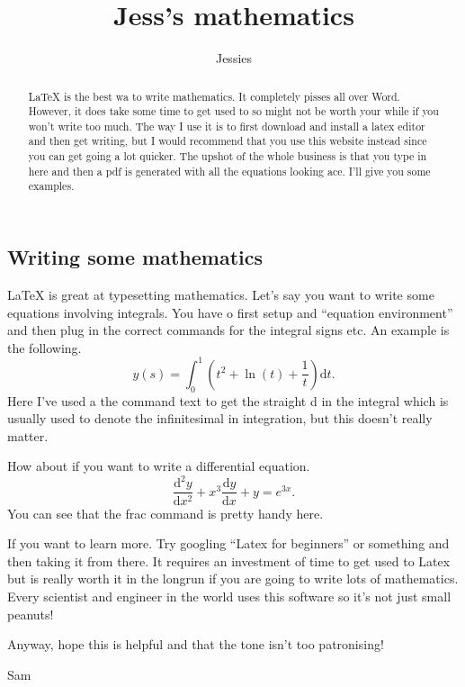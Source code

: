 \documentclass[a4paper]{article}
\title{Jess's mathematics}
\author{Jessies}
\begin{document}
\begin{preview}
\maketitle

\begin{abstract}
\LaTeX{} is the best wa to write mathematics. It completely pisses all over Word. However, it does take some time to get used to so might not be worth your while if you won't write too much. The way I use it is to first download and install a latex editor and then get writing, but I would recommend that you use this website instead since you can get going a lot quicker. The upshot of the whole business is that you type in here and then a pdf is generated with all the equations looking ace. I'll give you some examples. 
\end{abstract}

\section{Writing some mathematics}

\LaTeX{} is great at typesetting mathematics. Let's say you want to write some equations involving integrals. You have o first setup and ``equation environment'' and then plug in the correct commands for the integral signs etc. An example is the following.
\begin{equation}
		y(s) = \int_0^1 \left(t^2+\ln(t)+\frac{1}{t}\right)\text{d}t.
\end{equation}
Here I've used a the command text to get the straight d in the integral which is usually used to denote the infinitesimal in integration, but this doesn't really matter. 

How about if you want to write a differential equation. 
\begin{equation}
		\frac{\text{d}^2y}{\text{d}x^2}+ x^3\frac{\text{d}y}{\text{d}x}+y = e^{3x}.
\end{equation}
You can see that the frac command is pretty handy here.

If you want to learn more. Try googling ``Latex for beginners'' or something and then taking it from there. It requires an investment of time to get used to Latex but is really worth it in the longrun if you are going to write lots of mathematics. Every scientist and engineer in the world uses this software so it's not just small peanuts!

Anyway, hope this is helpful and that the tone isn't too patronising!

Sam

\end{preview}
\end{document}
